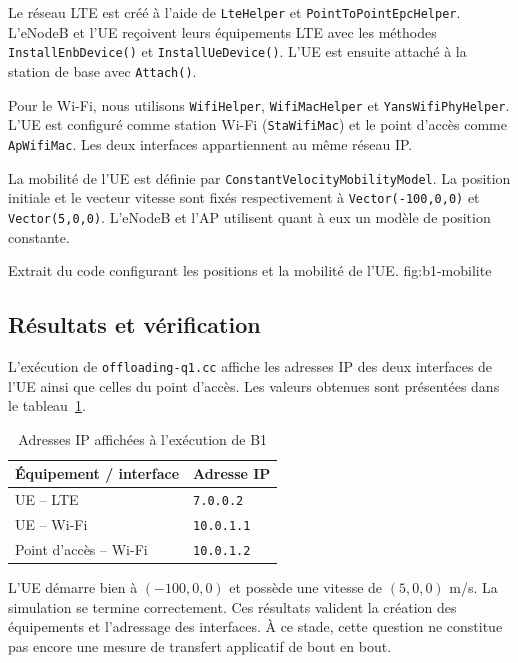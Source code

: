 Le réseau LTE est créé à l'aide de \texttt{LteHelper} et
\texttt{PointToPointEpcHelper}. L'eNodeB et l'UE reçoivent
leurs équipements LTE avec les méthodes
\texttt{InstallEnbDevice()} et \texttt{InstallUeDevice()}.
L'UE est ensuite attaché à la station de base avec
\texttt{Attach()}.

Pour le Wi-Fi, nous utilisons \texttt{WifiHelper},
\texttt{WifiMacHelper} et \texttt{YansWifiPhyHelper}.
L'UE est configuré comme station Wi-Fi (\texttt{StaWifiMac})
et le point d'accès comme \texttt{ApWifiMac}. Les deux
interfaces appartiennent au même réseau IP.

La mobilité de l'UE est définie par
\texttt{ConstantVelocityMobilityModel}. La position initiale
et le vecteur vitesse sont fixés respectivement à
\texttt{Vector(-100,0,0)} et \texttt{Vector(5,0,0)}.
L'eNodeB et l'AP utilisent quant à eux un modèle de position
constante.

{Extrait du code configurant les positions et la mobilité de l'UE.}
{fig:b1-mobilite}

\subsection{Résultats et vérification}

L'exécution de \texttt{offloading-q1.cc} affiche les adresses
IP des deux interfaces de l'UE ainsi que celles du point
d'accès. Les valeurs obtenues sont présentées dans le
tableau~\ref{tab:b1-adresses}.

\begin{table}[H]
    \centering
    \caption{Adresses IP affichées à l'exécution de B1}
    \label{tab:b1-adresses}
    \begin{tabular}{ll}
        \toprule
        \textbf{Équipement / interface} & \textbf{Adresse IP} \\
        \midrule
        UE -- LTE & \texttt{7.0.0.2} \\
        UE -- Wi-Fi & \texttt{10.0.1.1} \\
        Point d'accès -- Wi-Fi & \texttt{10.0.1.2} \\
        \bottomrule
    \end{tabular}
\end{table}

L'UE démarre bien à $(-100,0,0)$ et possède une vitesse
de $(5,0,0)$ m/s. La simulation se termine correctement.
Ces résultats valident la création des équipements et
l'adressage des interfaces. À ce stade, cette question
ne constitue pas encore une mesure de transfert applicatif
de bout en bout.

